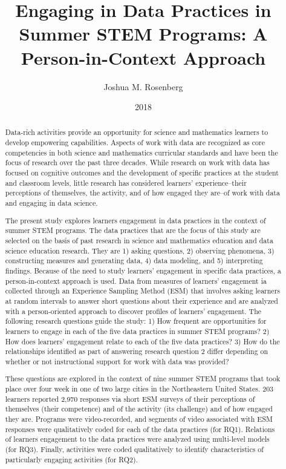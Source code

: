 \documentclass[]{msu-thesis}
\title{Engaging in Data Practices in Summer STEM Programs: A Person-in-Context Approach
}
\author{Joshua M. Rosenberg}
\date{2018}
\theoremstyle{definition}
\theoremstyle{definition}
\theoremstyle{definition}
\theoremstyle{remark}
\begin{document}

\maketitlepage
\begin{abstract}
Data-rich activities provide an opportunity for science and mathematics learners to develop empowering capabilities. Aspects of work with data are recognized as core competencies in both science and mathematics curricular standards and have been the focus of research over the past three decades. While research on work with data has focused on cognitive outcomes and the development of specific practices at the student and classroom levels, little research has considered learners' experience--their perceptions of themselves, the activity, and of how engaged they are--of work with data and engaging in data science.

The present study explores learners engagement in data practices in the context of summer STEM programs. The data practices that are the focus of this study are selected on the basis of past research in science and mathematics education and data science education research. They are 1) asking questions, 2) observing phenomena, 3) constructing measures and generating data, 4) data modeling, and 5) interpreting findings. Because of the need to study learners' engagement in specific data practices, a person-in-context approach is used. Data from measures of learners' engagement ia collected through an Experience Sampling Method (ESM) that involves asking learners at random intervals to answer short questions about their experience and are analyzed with a person-oriented approach to discover profiles of learners' engagement. The following research questions guide the study: 1) How frequent are opportunities for learners to engage in each of the five data practices in summer STEM programs? 2) How does learners' engagement relate to each of the five data practices? 3) How do the relationships identified as part of answering research question 2 differ depending on whether or not instructional support for work with data was provided?

These questions are explored in the context of nine summer STEM programs that took place over four week in one of two large cities in the Northeastern United States. 203 learners reported 2,970 responses via short ESM surveys of their perceptions of themselves (their competence) and of the activity (its challenge) and of how engaged they are. Programs were video-recorded, and segments of video associated with ESM responses were qualitatively coded for each of the data practices (for RQ1). Relations of learners engagement to the data practices were analyzed using multi-level models (for RQ3). Finally, activities were coded qualitatively to identify characteristics of particularly engaging activities (for RQ2).


\end{abstract}
\end{document}
